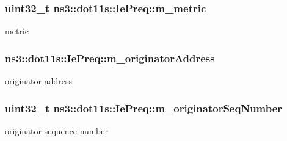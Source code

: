 \subsubsection[{\texorpdfstring{m\+\_\+metric}{m_metric}}]{\setlength{\rightskip}{0pt plus 5cm}uint32\+\_\+t ns3\+::dot11s\+::\+Ie\+Preq\+::m\+\_\+metric\hspace{0.3cm}{\ttfamily [private]}}\hypertarget{classns3_1_1dot11s_1_1IePreq_ab4a0c5e3fc5fe2cd7c356d427899ff87}{}\label{classns3_1_1dot11s_1_1IePreq_ab4a0c5e3fc5fe2cd7c356d427899ff87}


metric 

\subsubsection[{\texorpdfstring{m\+\_\+originator\+Address}{m_originatorAddress}}]{ ns3\+::dot11s\+::\+Ie\+Preq\+::m\+\_\+originator\+Address\hspace{0.3cm}{\ttfamily [private]}}\hypertarget{classns3_1_1dot11s_1_1IePreq_ad28b90801092d3c2accf79c2e6185624}{}\label{classns3_1_1dot11s_1_1IePreq_ad28b90801092d3c2accf79c2e6185624}


originator address 

\subsubsection[{\texorpdfstring{m\+\_\+originator\+Seq\+Number}{m_originatorSeqNumber}}]{\setlength{\rightskip}{0pt plus 5cm}uint32\+\_\+t ns3\+::dot11s\+::\+Ie\+Preq\+::m\+\_\+originator\+Seq\+Number\hspace{0.3cm}{\ttfamily [private]}}\hypertarget{classns3_1_1dot11s_1_1IePreq_a06180eb291acfe73e88640ab62120fc1}{}\label{classns3_1_1dot11s_1_1IePreq_a06180eb291acfe73e88640ab62120fc1}


originator sequence number 

